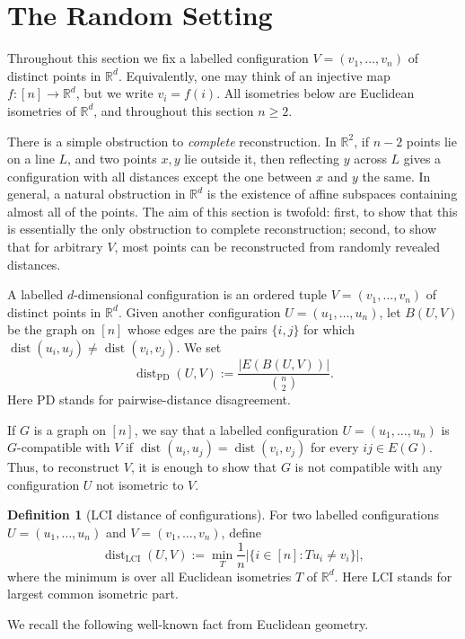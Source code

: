 \documentclass[fullpage,11pt]{article}
\newcommand{\R}{\mathbb{R}}
\newcommand{\LCI}{\mathrm{LCI}}
\newcommand{\PD}{\mathrm{PD}}
\providecommand{\dist}{\operatorname{dist}}
\theoremstyle{break}
\theoremstyle{definition}
\newtheorem*{definition}{Definition}
\theoremstyle{break}
\begin{document}
\section{The Random Setting}

Throughout this section we fix a labelled configuration
\(V=(v_1,\ldots,v_n)\) of distinct points in \(\R^d\). Equivalently, one may
think of an injective map \(f\colon[n]\to\R^d\), but we write
\(v_i=f(i)\). All isometries below are Euclidean isometries of \(\R^d\), and
throughout this section \(n\ge2\).

There is a simple obstruction to \emph{complete} reconstruction. In
\(\R^2\), if \(n-2\) points lie on a line \(L\), and two points \(x,y\) lie
outside it, then reflecting \(y\) across \(L\) gives a configuration with all
distances except the one between \(x\) and \(y\) the same. In general, a
natural obstruction in \(\R^d\) is the existence of affine subspaces
containing almost all of the points. The aim of this section is twofold:
first, to show that this is essentially the only obstruction to complete
reconstruction; second, to show that for arbitrary \(V\), most points can be
reconstructed from randomly revealed distances.

A labelled \(d\)-dimensional configuration is an ordered tuple
\(V=(v_1,\ldots,v_n)\) of distinct points in \(\R^d\). Given another
configuration \(U=(u_1,\ldots,u_n)\), let
\(B(U,V)\) be the graph on \([n]\) whose edges are the pairs \(\{i,j\}\) for
which \(\dist(u_i,u_j)\ne\dist(v_i,v_j)\). We set
\[
    \dist_{\PD}(U,V):=\frac{|E(B(U,V))|}{\binom n2}.
\]
Here \(\PD\) stands for pairwise-distance disagreement.

If \(G\) is a graph on \([n]\), we say that a labelled configuration
\(U=(u_1,\ldots,u_n)\) is \(G\)-compatible with \(V\) if
\(\dist(u_i,u_j)=\dist(v_i,v_j)\) for every \(ij\in E(G)\).
Thus, to reconstruct \(V\), it is enough to show that \(G\) is not compatible
with any configuration \(U\) not isometric to \(V\).

\begin{definition}[LCI distance of configurations]
For two labelled configurations \(U=(u_1,\ldots,u_n)\) and
\(V=(v_1,\ldots,v_n)\), define
\[
        \dist_{\LCI}(U,V)
        :=\min_T \frac{1}{n}\bigl|\{i\in[n]:T u_i\ne v_i\}\bigr|,
\]
where the minimum is over all Euclidean isometries \(T\) of \(\R^d\). Here
\(\LCI\) stands for largest common isometric part.
\end{definition}

\noindent We recall the following well-known fact from Euclidean geometry.
\end{document}
